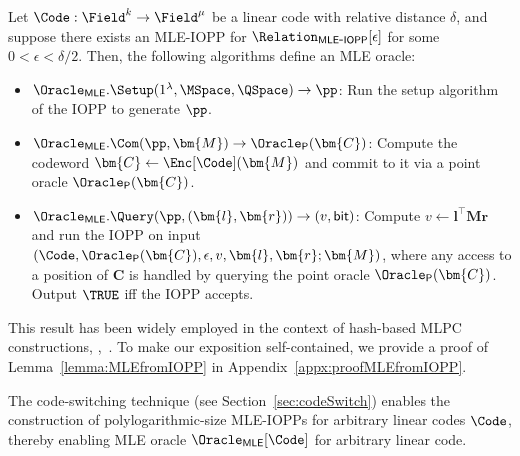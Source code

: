 \begin{lemma}
\label{lemma:MLEfromIOPP}
Let $\Code : \Field^k \rightarrow \Field^\mu$ be a linear code with relative distance $\delta$, and suppose there exists an MLE-IOPP for $\Relation_\mathsf{MLE\mbox{-}IOPP}[\epsilon]$ for some $0 < \epsilon < \delta/2$.
Then, the following algorithms define an MLE oracle:
\begin{itemize}
    \item $\Oracle_\mathsf{MLE}.\Setup(1^\lambda, \MSpace, \QSpace) \rightarrow \pp$:  
    Run the setup algorithm of the IOPP to generate $\pp$.

    \item $\Oracle_\mathsf{MLE}.\Com(\pp, \bm{M}) \rightarrow \Oracle_\mathsf{P}(\bm{C})$:  
    Compute the codeword $\bm{C} \leftarrow \Enc[\Code](\bm{M})$ and commit to it via a point oracle $\Oracle_\mathsf{P}(\bm{C})$.

    \item $\Oracle_\mathsf{MLE}.\Query(\pp, (\bm{l}, \bm{r})) \rightarrow (v, \mathsf{bit})$:  
    Compute $v \leftarrow \bm{l}^\top \bm{M} \bm{r}$ and run the IOPP on input $(\Code, \Oracle_\mathsf{P}(\bm{C}), \epsilon, v, \bm{l}, \bm{r}; \bm{M})$,
    where any access to a position of $\bm{C}$ is handled by querying the point oracle $\Oracle_\mathsf{P}(\bm{C})$.
    Output $\TRUE$ iff the IOPP accepts.
\end{itemize}
\end{lemma}

This result has been widely employed in the context of hash-based MLPC constructions,
\eg,~\cite{iacr/Ben-SassonBHR18,eurocrypt/BrehmCFRRZ25,crypto/GolovnevLSTW23,crypto/XieZS22,crypto/ZeilbergerCF24}.
To make our exposition self-contained, we provide a proof of Lemma~\ref{lemma:MLEfromIOPP} in Appendix~\ref{appx:proofMLEfromIOPP}.

The code-switching technique (see Section~\ref{sec:codeSwitch}) enables the construction of polylogarithmic-size MLE-IOPPs for arbitrary linear codes $\Code$,
thereby enabling MLE oracle $\Oracle_\mathsf{MLE}[\Code]$ for arbitrary linear code.

